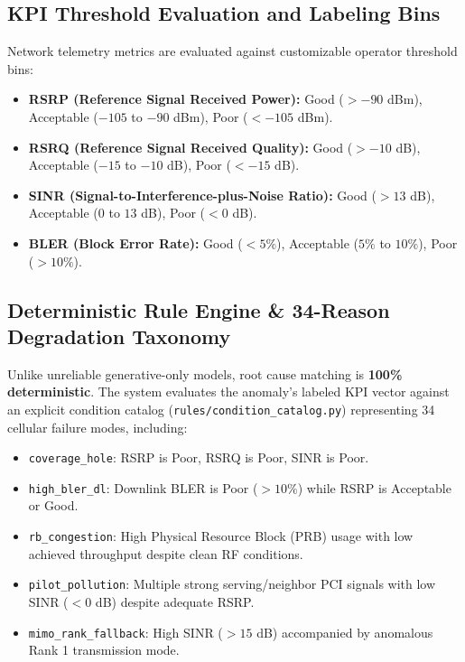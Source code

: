 \documentclass[12pt,a4paper]{report}
\begin{document}
\subsection{KPI Threshold Evaluation and Labeling Bins}
Network telemetry metrics are evaluated against customizable operator threshold bins:
\begin{itemize}
    \item \textbf{RSRP (Reference Signal Received Power):} Good ($> -90$ dBm), Acceptable ($-105$ to $-90$ dBm), Poor ($< -105$ dBm).
    \item \textbf{RSRQ (Reference Signal Received Quality):} Good ($> -10$ dB), Acceptable ($-15$ to $-10$ dB), Poor ($< -15$ dB).
    \item \textbf{SINR (Signal-to-Interference-plus-Noise Ratio):} Good ($> 13$ dB), Acceptable ($0$ to $13$ dB), Poor ($< 0$ dB).
    \item \textbf{BLER (Block Error Rate):} Good ($< 5\%$), Acceptable ($5\%$ to $10\%$), Poor ($> 10\%$).
\end{itemize}

\subsection{Deterministic Rule Engine \& 34-Reason Degradation Taxonomy}
Unlike unreliable generative-only models, root cause matching is \textbf{100\% deterministic}. The system evaluates the anomaly's labeled KPI vector against an explicit condition catalog (\texttt{rules/condition_catalog.py}) representing 34 cellular failure modes, including:
\begin{itemize}
    \item \texttt{coverage\_hole}: RSRP is Poor, RSRQ is Poor, SINR is Poor.
    \item \texttt{high\_bler\_dl}: Downlink BLER is Poor ($>10\%$) while RSRP is Acceptable or Good.
    \item \texttt{rb\_congestion}: High Physical Resource Block (PRB) usage with low achieved throughput despite clean RF conditions.
    \item \texttt{pilot\_pollution}: Multiple strong serving/neighbor PCI signals with low SINR ($<0$ dB) despite adequate RSRP.
    \item \texttt{mimo\_rank\_fallback}: High SINR ($>15$ dB) accompanied by anomalous Rank 1 transmission mode.
\end{itemize}
\end{document}
